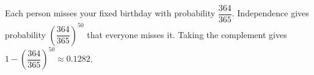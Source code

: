 Each person misses your fixed birthday with probability $\dfrac{364}{365}$. Independence gives probability $\left(\dfrac{364}{365}\right)^{50}$ that everyone misses it. Taking the complement gives $\boxed{1-\left(\dfrac{364}{365}\right)^{50}}\approx0.1282 $.

